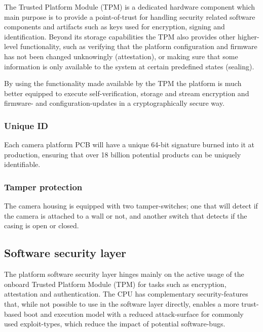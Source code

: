\documentclass[10pt]{article}
\begin{document}
        The Trusted Platform Module (TPM) is a dedicated hardware component
        which main purpose is to provide a point-of-trust for handling security
        related software components and artifacts such as keys used for
        encryption, signing and identification. Beyond its storage
        capabilities the TPM also provides other higher-level functionality,
        such as verifying that the platform configuration and firmware has not
        been changed unknowingly (attestation), or making sure that some information
        is only available to the system at certain predefined states (sealing).

        By using the functionality made available by the TPM the platform is
        much better equipped to execute self-verification, storage and stream
        encryption and firmware- and configuration-updates in a cryptographically
        secure way.

      \subsubsection{Unique ID}

        Each camera platform PCB will have a unique 64-bit signature burned
        into it at production, ensuring that over 18 billion potential products
        can be uniquely identifiable.

      \subsubsection{Tamper protection}

        The camera housing is equipped with two tamper-switches; one that
        will detect if the camera is attached to a wall or not, and another
        switch that detects if the casing is open or closed.

    \subsection{Software security layer}

      The platform software security layer hinges mainly on the active usage of
      the onboard Trusted Platform Module (TPM) for tasks such as encryption,
      attestation and authentication. The CPU has complementary
      security-features that, while not possible to use in the software layer
      directly, enables a more trust-based boot and execution model with a
      reduced attack-surface for commonly used exploit-types, which reduce the
      impact of potential software-bugs.
\end{document}
